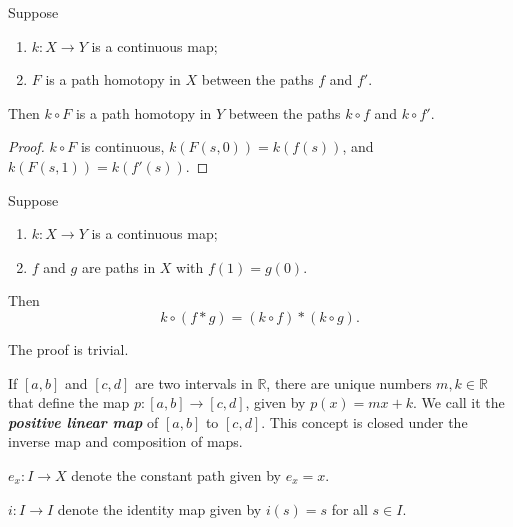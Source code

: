 \begin{mylemma}
Suppose
\begin{enumerate}[label={(\alph*)}]
\item $k:X\to Y$ is a continuous map;
\item $F$ is a path homotopy in $X$ between the paths $f$ and $f'$.
\end{enumerate}
Then $k\circ F$ is a path homotopy in $Y$ between the paths $k\circ f$ and $k\circ f'$.
\end{mylemma}
\begin{proof}
$k\circ F$ is continuous, $k(F(s,0)) = k(f(s))$, and $k(F(s,1)) = k(f'(s))$.
\end{proof}

\begin{mylemma}
Suppose
\begin{enumerate}[label={(\alph*)}]
\item $k:X\to Y$ is a continuous map;
\item $f$ and $g$ are paths in $X$ with $f(1)=g(0)$.
\end{enumerate}
Then
$$ k\circ (f*g)=(k\circ f)*(k\circ g).$$
\end{mylemma}
The proof is trivial.

\begin{mylemma}
If $[a,b]$ and $[c,d]$ are two intervals in $\mathbb{R}$, there are unique numbers $m,k\in \mathbb{R}$ that define the map $p:[a,b]\to [c,d]$, given by $p(x)=mx+k$. We call it the \textbf{\emph{positive linear map}} of $[a,b]$ to $[c,d]$. This concept is closed under the inverse map and composition of maps.
\end{mylemma}

\begin{notebox}
$e_x: I\to X$ denote the constant path given by $e_x = x$.
\end{notebox}
\begin{notebox}
$i:I\to I$ denote the identity map given by $i(s) = s$ for all $s\in I$.
\end{notebox}

